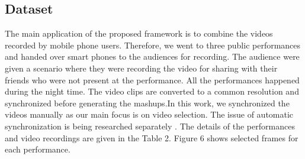\documentclass{IEEEtran}
\begin{document}
\subsection{Dataset}
The main application of the proposed framework is to combine the videos recorded by mobile phone users. Therefore, we went to three public performances and handed over smart phones to the audiences for recording. The audience were given a scenario where they were recording the video for sharing with their friends who were not present at the performance. All the performances happened during the night time. The video clips are converted to a common resolution and synchronized before generating the mashups.In this work, we synchronized the videos manually as our main focus is on video selection. The issue of automatic synchronization is being researched separately \cite{web:14}. The details of the performances and video recordings are given in the Table 2. Figure 6 shows selected frames for each performance.
\end{document}
